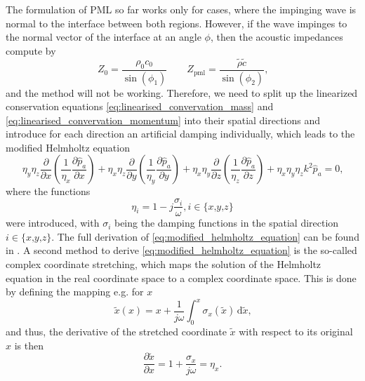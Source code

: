 The formulation of PML so far works only for cases, where the impinging wave is normal to the interface between both regions. However, if the wave impinges to the normal vector of the interface at an angle $\phi$, then the acoustic impedances compute by
\begin{equation}
	Z_{\text{0}} = \frac{\rho_0 c_0}{\sin(\phi_1)}\qquad Z_{\text{pml}} = \frac{\tilde{\rho} \tilde{c}}{\sin(\phi_2)} \text{,}
\end{equation}
and the method will not be working. Therefore, we need to split up the linearized conservation equations \cref{eq:linearised_convervation_mass} and \cref{eq:linearised_convervation_momentum} into their spatial directions and introduce for each direction an artificial damping individually, which leads to the modified Helmholtz equation
\begin{equation}
	\eta_y\eta_z\frac{\partial}{\partial x}\left(\frac{1}{\eta_x}\frac{\partial\hat{p}_a}{\partial x}\right) + \eta_x\eta_z\frac{\partial}{\partial y}\left(\frac{1}{\eta_y}\frac{\partial\hat{p}_a}{\partial y}\right) + \eta_x\eta_y\frac{\partial}{\partial z}\left(\frac{1}{\eta_z}\frac{\partial\hat{p}_a}{\partial z}\right) + \eta_x\eta_y\eta_zk^2\hat{p}_a = 0 \text{,} \label{eq:modified_helmholtz_equation}
\end{equation}
where the functions
\begin{equation}
	\eta_i = 1 - j\frac{\sigma_i}{\omega}\text{,}\,i \in \lbrace x\text{,}y\text{,}z\rbrace
\end{equation}
were introduced, with $\sigma_i$ being the damping functions in the spatial direction $i\in\lbrace x\text{,}y\text{,}z\rbrace$. The full derivation of \cref{eq:modified_helmholtz_equation} can be found in \cite{kaltenbacher_numerical_2007}. A second method to derive \cref{eq:modified_helmholtz_equation} is the so-called complex coordinate stretching, which maps the solution of the Helmholtz equation in the real coordinate space to a complex coordinate space. This is done by defining the mapping e.g. for $x$
\begin{equation}
	\tilde{x}(x) = x + \frac{1}{j\omega}\int_{0}^{x} \sigma_x(\tilde{x})\,\text{d}\tilde{x}\text{,}
\end{equation}
and thus, the derivative of the stretched coordinate $\tilde{x}$ with respect to its original $x$ is then
\begin{equation}
	\frac{\partial \tilde{x}}{\partial x} = 1 + \frac{\sigma_x}{j\omega} = \eta_x \text{.} \label{eq:derivative_stretched_coordinate}
\end{equation}
